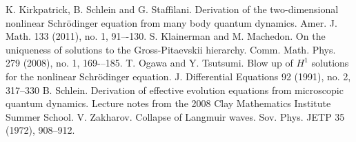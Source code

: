 \documentclass[reqno]{amsart}
\numberwithin{equation}{section}
\theoremstyle{remark}
\begin{document}
\begin{thebibliography}{9}
 K. Kirkpatrick, B. Schlein and G. Staffilani.  Derivation of the two-dimensional nonlinear Schrödinger equation from many body quantum dynamics.  Amer. J. Math. 133 (2011), no. 1, 91–-130.
 S. Klainerman and M. Machedon.  On the uniqueness of solutions to the Gross-Pitaevskii hierarchy. Comm. Math. Phys. 279 (2008), no. 1, 169-–185.
 T. Ogawa and Y. Tsutsumi. Blow up of $H^1$ solutions for the nonlinear Schr\"odinger equation. J. Differential Equations 92 (1991), no. 2, 317--330
 B. Schlein. Derivation of effective evolution equations from microscopic quantum dynamics.  Lecture notes from the 2008 Clay Mathematics Institute Summer School.
 V. Zakharov.  Collapse of Langmuir waves.  Sov. Phys. JETP 35 (1972), 908--912.
\end{thebibliography}
\end{document}
